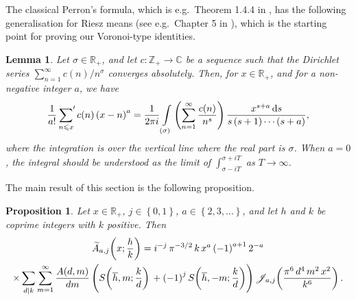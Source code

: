 \documentclass[a4paper,10pt,twoside]{amsart}
\newtheorem{lemma}[theorem]{Lemma}
\newtheorem{proposition}[theorem]{Proposition}
\theoremstyle{definition}
\numberwithin{equation}{section}
\renewcommand\:{\colon}
\newcommand{\sump}{\mathop{{\sum}^{\raisebox{-3pt}{\makebox[0pt][l]{$'$}}}}}
\begin{document}
The classical Perron's formula, which is e.g.\ Theorem 1.4.4 in \cite{Brudern}, has the following generalisation for Riesz means (see e.g.\ Chapter 5 in \cite{Montgomery--Vaughan}), which is the starting point for proving our Voronoi-type identities. 
\begin{lemma}\label{perron-formula-for-riesz-means}
Let $\sigma\in\mathbb R_+$, and let $c\colon\mathbb Z_+\longrightarrow\mathbb C$ be a sequence such that the Dirichlet series $\sum_{n=1}^\infty c(n)/n^\sigma$ converges absolutely. Then, for $x\in\mathbb R_+$, and for a non-negative integer $a$, we have
\[\frac1{a!}\sump_{n\leqslant x}\,c(n)\left(x-n\right)^a
=\frac1{2\pi i}\int\limits_{(\sigma)}\left(\sum_{n=1}^\infty\frac{c(n)}{n^s}\right)\frac{x^{s+a}\,\mathrm ds}{s\left(s+1\right)\cdots\left(s+a\right)},\]
where the integration is over the vertical line where the real part is $\sigma$. When $a=0$, the integral should be understood as the limit of $\int_{\sigma-iT}^{\sigma+iT}$ as $T\longrightarrow\infty$.
\end{lemma}

\noindent The main result of this section is the following proposition. 

\begin{proposition}\label{riesz-identity-with-large-exponent}
Let $x\in\mathbb R_+$, $j\in\left\{0,1\right\}$, $a\in\left\{2,3,\ldots\right\}$, and let $h$ and $k$ be coprime integers with $k$ positive. Then
\begin{multline*}
\widetilde A_{a,j}\!\left(x;\frac hk\right)
=
i^{-j}\,\pi^{-3/2}\,k\,x^a\left(-1\right)^{a+1}2^{-a}\\\times\sum_{d\mid k}\sum_{m=1}^\infty\frac{A(d,m)}{dm}\left(S\!\left(\overline h,m;\frac kd\right)\vphantom{\Bigg|}+\left(-1\right)^jS\!\left(\overline h,-m;\frac kd\right)\right)
\mathscr J_{a,j}\!\left(\frac{\pi^6\,d^4\,m^2\,x^2}{k^6}\right).
\end{multline*}
\end{proposition}
\end{document}
